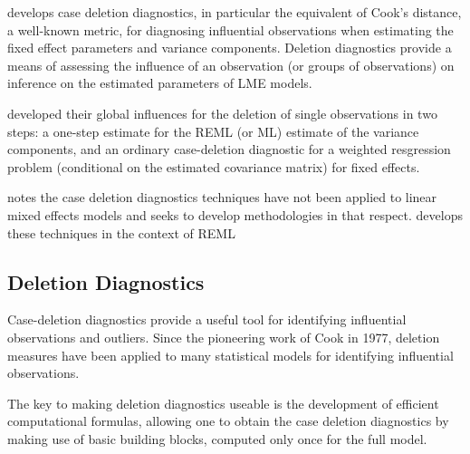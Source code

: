 \documentclass[12pt, a4paper]{report}
\theoremstyle{plain}
\theoremstyle{definition}
\theoremstyle{remark}
\begin{document}
\citet{Christensen} develops  case deletion diagnostics, in particular the equivalent of  Cook's distance, a well-known metric, for diagnosing influential observations when estimating the fixed effect parameters and variance components. Deletion diagnostics provide a means of assessing the influence of an observation (or groups of observations) on inference on the estimated parameters of LME models.

\citet{Christensen} developed their global influences for the deletion of single observations in two steps: a one-step estimate for the REML (or ML) estimate of the variance components, and an ordinary case-deletion diagnostic for a weighted resgression problem (conditional on the estimated covariance matrix) for fixed effects.

\citet{Christensen} notes the case deletion diagnostics techniques have not been applied to linear mixed effects models and seeks to develop methodologies in that respect. \citet{Christensen} develops these techniques in the context of REML
	
%	
%	

		\subsection{Deletion Diagnostics}
	
Case-deletion diagnostics provide a useful tool for identifying influential observations and outliers. Since the pioneering work of Cook in 1977, deletion measures have been applied to many statistical models for identifying influential observations.
	
The key to making deletion diagnostics useable is the development of efficient computational formulas, allowing one to obtain the  case deletion diagnostics by making use of basic building blocks, computed only once for the full model.
	
\end{document}
